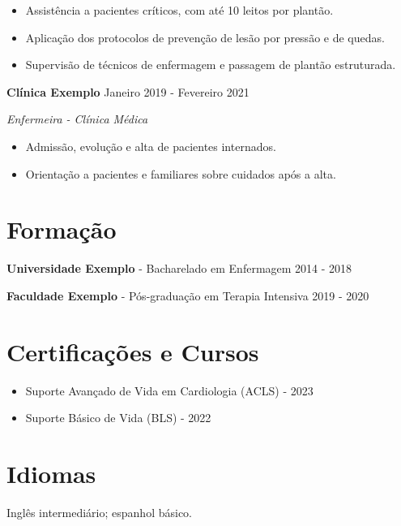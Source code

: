 \documentclass[a4paper,10pt]{article}
\begin{document}
\begin{itemize}[leftmargin=*]
    \item Assistência a pacientes críticos, com até 10 leitos por plantão.
    \item Aplicação dos protocolos de prevenção de lesão por pressão e de quedas.
    \item Supervisão de técnicos de enfermagem e passagem de plantão estruturada.
\end{itemize}

\textbf{Clínica Exemplo} \hfill Janeiro 2019 - Fevereiro 2021

\textit{Enfermeira - Clínica Médica}

\begin{itemize}[leftmargin=*]
    \item Admissão, evolução e alta de pacientes internados.
    \item Orientação a pacientes e familiares sobre cuidados após a alta.
\end{itemize}

\section*{Formação}

\textbf{Universidade Exemplo} - Bacharelado em Enfermagem \hfill 2014 - 2018

\textbf{Faculdade Exemplo} - Pós-graduação em Terapia Intensiva \hfill 2019 - 2020

\section*{Certificações e Cursos}

\begin{itemize}[leftmargin=*]
    \item Suporte Avançado de Vida em Cardiologia (ACLS) - 2023
    \item Suporte Básico de Vida (BLS) - 2022
\end{itemize}

\section*{Idiomas}

Inglês intermediário; espanhol básico.
\end{document}
